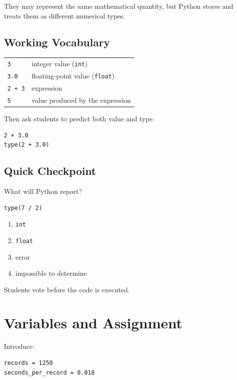\documentclass[11pt]{article}
\begin{document}
They may represent the same mathematical quantity, but Python stores and treats them as different numerical types.

\subsection*{Working Vocabulary}

\begin{center}
\begin{tabular}{ll}
\toprule
\texttt{3} & integer value (\texttt{int}) \\
\texttt{3.0} & floating-point value (\texttt{float}) \\
\texttt{2 + 3} & expression \\
\texttt{5} & value produced by the expression \\
\bottomrule
\end{tabular}
\end{center}

Then ask students to predict both value and type:

\begin{lstlisting}
2 + 3.0
type(2 + 3.0)
\end{lstlisting}

\subsection*{Quick Checkpoint}

What will Python report?

\begin{lstlisting}
type(7 / 2)
\end{lstlisting}

\begin{enumerate}[label=\Alph*.]
    \item \texttt{int}
    \item \texttt{float}
    \item error
    \item impossible to determine
\end{enumerate}

Students vote before the code is executed.

\section{Variables and Assignment}

Introduce:

\begin{lstlisting}
records = 1250
seconds_per_record = 0.018
\end{lstlisting}
\end{document}
